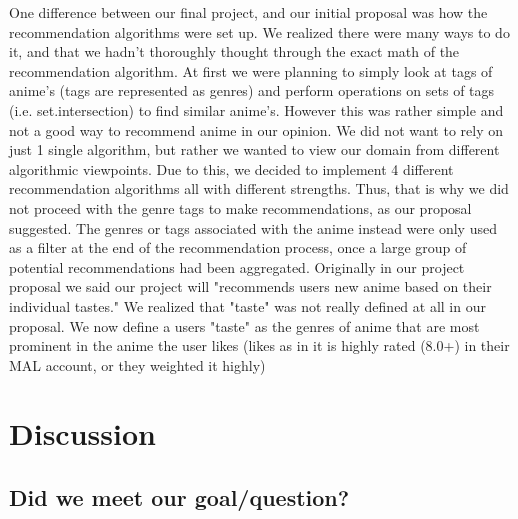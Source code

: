 \documentclass[fontsize=11pt]{article}
\begin{document}
One difference between our final project, and our initial proposal was how the recommendation algorithms were set up. We realized there were many ways to do it, and that we hadn't thoroughly thought through the exact math of the recommendation algorithm. At first we were planning to simply look at tags of anime's (tags are represented as genres) and perform operations on sets of tags (i.e. set.intersection) to find similar anime's. However this was rather simple and not a good way to recommend anime in our opinion. We did not want to rely on just 1 single algorithm, but rather we wanted to view our domain from different algorithmic viewpoints. Due to this, we decided to implement 4 different recommendation algorithms all with different strengths. Thus, that is why we did not proceed with the genre tags to make recommendations, as our proposal suggested. The genres or tags associated with the anime instead were only used as a filter at the end of the recommendation process, once a large group of potential recommendations had been aggregated. Originally in our project proposal we said our project will "recommends users new anime based on their individual tastes." We realized that "taste" was not really defined at all in our proposal. We now define a users "taste" as the genres of anime that are most prominent in the anime the user likes (likes as in it is highly rated (8.0+) in their MAL account, or they weighted it highly)

\section*{Discussion}
\subsection{Did we meet our goal/question?}
\end{document}

